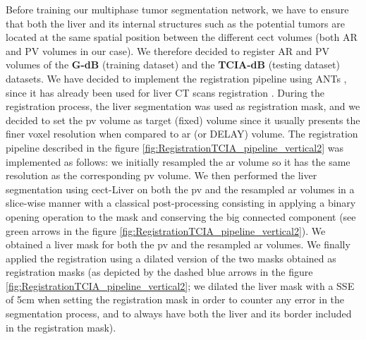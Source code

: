 \documentclass[]{article}
\newcommand{\pplfont}[1]{{\fontfamily{ppl}\selectfont #1}}
\newcommand{\lmttfont}[1]{{\fontfamily{lmtt}\selectfont #1}}
\begin{document}
Before training our multiphase tumor segmentation network, we have to ensure that both the liver and its internal structures such as the potential tumors are located at the same spatial position between
the different \ac{cect} volumes (both AR and PV volumes in our case). We therefore decided to register AR and PV volumes of the \textbf{\lmttfont{G-dB}} (training dataset) and the \textbf{\lmttfont{TCIA-dB}} (testing dataset) datasets.
We have decided to implement the registration pipeline using ANTs \cite{avants2009advanced}, since it has already been used for liver
CT scans registration \cite{Zhao2019,Zhao2020}.
During the registration process, the liver segmentation was used as
registration mask, and we decided to set the \ac{pv} volume as target (fixed)
volume since it usually presents the finer voxel resolution when
compared to \ac{ar} (or DELAY) volume. The registration pipeline described in the figure \ref{fig:RegistrationTCIA_pipeline_vertical2} was implemented as follows: we initially resampled the \ac{ar} volume so it has the same resolution as the corresponding \ac{pv} volume. We then performed the liver segmentation using \pplfont{\ac{cect}-Liver} on both the \ac{pv} and the resampled \ac{ar} volumes in a slice-wise manner with a classical post-processing consisting in applying a binary opening operation to the mask and conserving the big connected component (see green arrows in the figure \ref{fig:RegistrationTCIA_pipeline_vertical2}). We obtained a liver mask for both the \ac{pv} and the resampled \ac{ar} volumes. We finally applied the registration using a dilated version of the two masks obtained as registration masks (as depicted by the dashed blue arrows in the figure \ref{fig:RegistrationTCIA_pipeline_vertical2}; we dilated the liver mask with a SSE of 5cm when setting the registration mask in order to counter any error in the segmentation process, and to always have both the liver and its border included in the registration mask).
\end{document}
